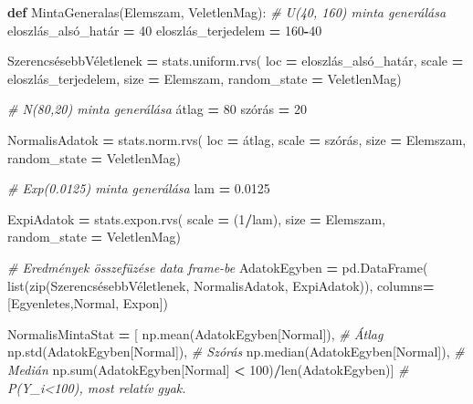 \documentclass[
]{book}
\newenvironment{Shaded}{\begin{snugshade}}{\end{snugshade}}
\newcommand{\BuiltInTok}[1]{#1}
\newcommand{\CommentTok}[1]{\textcolor[rgb]{0.56,0.35,0.01}{\textit{#1}}}
\newcommand{\DecValTok}[1]{\textcolor[rgb]{0.00,0.00,0.81}{#1}}
\newcommand{\FloatTok}[1]{\textcolor[rgb]{0.00,0.00,0.81}{#1}}
\newcommand{\KeywordTok}[1]{\textcolor[rgb]{0.13,0.29,0.53}{\textbf{#1}}}
\newcommand{\NormalTok}[1]{#1}
\newcommand{\OperatorTok}[1]{\textcolor[rgb]{0.81,0.36,0.00}{\textbf{#1}}}
\newcommand{\StringTok}[1]{\textcolor[rgb]{0.31,0.60,0.02}{#1}}
\begin{document}
\begin{Shaded}
\begin{Highlighting}[]
\KeywordTok{def}\NormalTok{ MintaGeneralas(Elemszam, VeletlenMag):}
    \CommentTok{\# U(40, 160) minta generálása}
\NormalTok{    eloszlás\_alsó\_határ }\OperatorTok{=} \DecValTok{40}
\NormalTok{    eloszlás\_terjedelem }\OperatorTok{=} \DecValTok{160}\OperatorTok{{-}}\DecValTok{40}
  
\NormalTok{    SzerencsésebbVéletlenek }\OperatorTok{=}\NormalTok{ stats.uniform.rvs(}
\NormalTok{      loc }\OperatorTok{=}\NormalTok{ eloszlás\_alsó\_határ,}
\NormalTok{      scale }\OperatorTok{=}\NormalTok{ eloszlás\_terjedelem,}
\NormalTok{      size }\OperatorTok{=}\NormalTok{ Elemszam,}
\NormalTok{      random\_state }\OperatorTok{=}\NormalTok{ VeletlenMag)}
  
    \CommentTok{\# N(80,20) minta generálása}
\NormalTok{    átlag }\OperatorTok{=} \DecValTok{80}
\NormalTok{    szórás }\OperatorTok{=} \DecValTok{20}

\NormalTok{    NormalisAdatok }\OperatorTok{=}\NormalTok{ stats.norm.rvs(}
\NormalTok{      loc }\OperatorTok{=}\NormalTok{ átlag,}
\NormalTok{      scale }\OperatorTok{=}\NormalTok{ szórás,}
\NormalTok{      size }\OperatorTok{=}\NormalTok{ Elemszam,}
\NormalTok{      random\_state }\OperatorTok{=}\NormalTok{ VeletlenMag)}
  
    \CommentTok{\# Exp(0.0125) minta generálása}
\NormalTok{    lam }\OperatorTok{=} \FloatTok{0.0125}

\NormalTok{    ExpiAdatok }\OperatorTok{=}\NormalTok{ stats.expon.rvs(}
\NormalTok{      scale }\OperatorTok{=}\NormalTok{ (}\DecValTok{1}\OperatorTok{/}\NormalTok{lam),}
\NormalTok{      size }\OperatorTok{=}\NormalTok{ Elemszam,}
\NormalTok{      random\_state }\OperatorTok{=}\NormalTok{ VeletlenMag)}

    \CommentTok{\# Eredmények összefüzése data frame{-}be}
\NormalTok{    AdatokEgyben }\OperatorTok{=}\NormalTok{ pd.DataFrame(}
      \BuiltInTok{list}\NormalTok{(}\BuiltInTok{zip}\NormalTok{(SzerencsésebbVéletlenek, NormalisAdatok, ExpiAdatok)),}
\NormalTok{      columns}\OperatorTok{=}\NormalTok{[}\StringTok{\textquotesingle{}Egyenletes\textquotesingle{}}\NormalTok{,}\StringTok{\textquotesingle{}Normal\textquotesingle{}}\NormalTok{, }\StringTok{\textquotesingle{}Expon\textquotesingle{}}\NormalTok{])}

\NormalTok{    NormalisMintaStat }\OperatorTok{=}\NormalTok{ [}
\NormalTok{      np.mean(AdatokEgyben[}\StringTok{\textquotesingle{}Normal\textquotesingle{}}\NormalTok{]), }\CommentTok{\# Átlag}
\NormalTok{      np.std(AdatokEgyben[}\StringTok{\textquotesingle{}Normal\textquotesingle{}}\NormalTok{]), }\CommentTok{\# Szórás}
\NormalTok{      np.median(AdatokEgyben[}\StringTok{\textquotesingle{}Normal\textquotesingle{}}\NormalTok{]), }\CommentTok{\# Medián}
\NormalTok{      np.}\BuiltInTok{sum}\NormalTok{(AdatokEgyben[}\StringTok{\textquotesingle{}Normal\textquotesingle{}}\NormalTok{] }\OperatorTok{\textless{}} \DecValTok{100}\NormalTok{)}\OperatorTok{/}\BuiltInTok{len}\NormalTok{(AdatokEgyben)] }\CommentTok{\# P(Y\_i\textless{}100), most relatív gyak.}


\end{Highlighting}
\end{Shaded}
\end{document}
